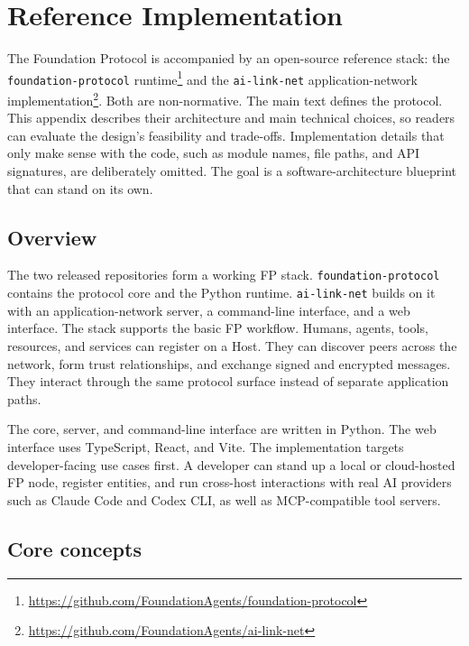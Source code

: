 \newpage
\appendix

\section{Reference Implementation}
\label{app:ref}

The Foundation Protocol is accompanied by an open-source reference stack:
the \texttt{foundation-protocol} runtime\footnote{
\url{https://github.com/FoundationAgents/foundation-protocol}}
and the \texttt{ai-link-net} application-network implementation\footnote{
\url{https://github.com/FoundationAgents/ai-link-net}}.
Both are non-normative. The main text defines the protocol. This appendix describes their architecture and main technical choices, so readers can evaluate the design's feasibility and trade-offs.
Implementation details that only make sense with the code, such as module names, file paths, and API signatures, are deliberately omitted. The goal is a software-architecture blueprint that can stand on its own.

\subsection{Overview}
\label{app:overview}

The two released repositories form a working FP stack. \texttt{foundation-protocol} contains the protocol core and the Python runtime. \texttt{ai-link-net} builds on it with an application-network server, a command-line interface, and a web interface.
The stack supports the basic FP workflow. Humans, agents, tools, resources, and services can register on a Host. They can discover peers across the network, form trust relationships, and exchange signed and encrypted messages. They interact through the same protocol surface instead of separate application paths.

The core, server, and command-line interface are written in Python. The web interface uses TypeScript, React, and Vite. The implementation targets developer-facing use cases first. A developer can stand up a local or cloud-hosted FP node, register entities, and run cross-host interactions with real AI providers such as Claude Code and Codex CLI, as well as MCP-compatible tool servers.

\subsection{Core concepts}
\label{app:concepts}


